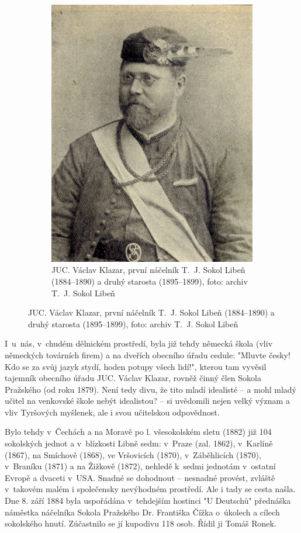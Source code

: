 \documentclass[a5paper, 11pt, twoside]{article}
\begin{document}
\begin{figure}[h]
\begin{subfigure}{0.45\textwidth}
   \includegraphics[width=\textwidth]{img/02_klazar.jpg}
  \caption*{JUC. Václav Klazar, první náčelník T.~J. Sokol Libeň (1884–⁠⁠⁠⁠⁠⁠1890) a druhý starosta (1895–⁠⁠⁠⁠⁠⁠1899), foto: archiv T.~J. Sokol Libeň}
  \end{subfigure}
\end{figure}

I~u~nás, v~chudém dělnickém prostředí, byla již tehdy německá škola (vliv německých továrních firem) a na dveřích obecního úřadu cedule: "Mluvte česky! Kdo se za svůj jazyk stydí, hoden potupy všech lidí!", kterou tam vyvěsil tajemník obecního úřadu JUC. Václav Klazar, rovněž činný člen Sokola Pražského (od roku 1879). Není tedy divu, že tito mladí idealisté --⁠⁠⁠⁠⁠⁠ a mohl mladý učitel na venkovské škole nebýt
idealistou? --⁠⁠⁠⁠⁠⁠ si uvědomili nejen velký význam a vliv Tyršových
myšlenek, ale i svou učitelskou odpovědnost.

Bylo tehdy v~Čechách a na Moravě po l. všesokolském sletu (1882) již 104 sokolských jednot a v~blízkosti Libně sedm: v~Praze (zal. 1862), v~Karlíně (1867), na Smíchově (1868), ve Vršovicích (1870), v~Záběhlicích (1870), v~Braníku (1871) a na Žižkově (1872), nehledě k~sedmi jednotám v~ostatní Evropě a dvaceti v~USA. Snadné se dohodnout -- nesnadné provést, zvláště v~takovém malém i společensky nevýhodném prostředí. Ale i tady se cesta našla. Dne 8. září 1884 byla uspořádána v~tehdejším hostinci "U Deutschů" přednáška náměstka náčelníka Sokola Pražského Dr. Františka Čížka o~úkolech a cílech sokolského hnutí. Zúčastnilo se jí kupodivu 118 osob. Řídil ji Tomáš Ronek.
\end{document}
